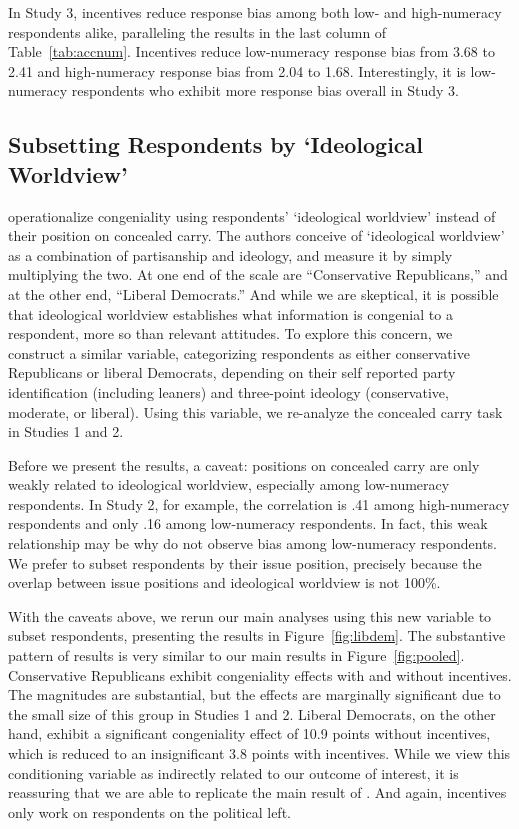 \documentclass[12pt, letterpaper]{article}
\begin{document}
In Study 3, incentives reduce response bias among both low- and high-numeracy respondents alike, paralleling the results in the last column of Table~\ref{tab:accnum}. Incentives reduce low-numeracy response bias from 3.68 to 2.41 and high-numeracy response bias from 2.04 to 1.68. Interestingly, it is low-numeracy respondents who exhibit more response bias overall in Study 3.

\clearpage
\subsection{Subsetting Respondents by `Ideological Worldview'}
\label{sec:kahan}
\doublespacing

\citet{kahan2017} operationalize congeniality using respondents' `ideological worldview' instead of their position on concealed carry. The authors conceive of `ideological worldview' as a combination of partisanship and ideology, and measure it by simply multiplying the two. At one end of the scale are ``Conservative Republicans,'' and at the other end, ``Liberal Democrats.'' And while we are skeptical, it is possible that ideological worldview establishes what information is congenial to a respondent, more so than relevant attitudes. To explore this concern, we construct a similar variable, categorizing respondents as either conservative Republicans or liberal Democrats, depending on their self reported party identification (including leaners) and three-point ideology (conservative, moderate, or liberal). Using this variable, we re-analyze the concealed carry task in Studies 1 and 2.  

Before we present the results, a caveat: positions on concealed carry are only weakly related to ideological worldview, especially among low-numeracy respondents. In Study 2, for example, the correlation is .41 among high-numeracy respondents and only .16 among low-numeracy respondents. In fact, this weak relationship may be why \citeauthor{kahan2017} do not observe bias among low-numeracy respondents. We prefer to subset respondents by their issue position, precisely because the overlap between issue positions and ideological worldview is not 100\%.

With the caveats above, we rerun our main analyses using this new variable to subset respondents, presenting the results in Figure~\ref{fig:libdem}. The substantive pattern of results is very similar to our main results in Figure~\ref{fig:pooled}. Conservative Republicans exhibit congeniality effects with and without incentives. The magnitudes are substantial, but the effects are marginally significant due to the small size of this group in Studies 1 and 2. Liberal Democrats, on the other hand, exhibit a significant congeniality effect of 10.9 points without incentives, which is reduced to an insignificant 3.8 points with incentives. While we view this conditioning variable as indirectly related to our outcome of interest, it is reassuring that we are able to replicate the main result of \citeauthor{kahan2017}. And again, incentives only work on respondents on the political left.
\end{document}
